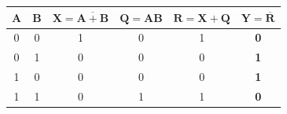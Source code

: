 \documentclass[12pt,a4paper]{article}
\renewcommand{\arraystretch}{1.4}
\begin{document}
\begin{truthtablebox}

\vspace{0.25cm}
\begin{center}
\renewcommand{\arraystretch}{1.4}
\setlength{\tabcolsep}{12pt}

\begin{tabular}{|c|c||c|c|c||c|}
\hline
\textbf{A} & \textbf{B} &
$\mathbf{X=\overline{A+B}}$ &
$\mathbf{Q=AB}$ &
$\mathbf{R=X+Q}$ &
$\mathbf{Y=\overline{R}}$
\\
\hline

0 & 0 & 1 & 0 & 1 & \textbf{0} \\
\hline

0 & 1 & 0 & 0 & 0 & \textbf{1} \\
\hline

1 & 0 & 0 & 0 & 0 & \textbf{1} \\
\hline

1 & 1 & 0 & 1 & 1 & \textbf{0} \\
\hline

\end{tabular}
\end{center}
\end{truthtablebox}
\newpage
\end{document}
